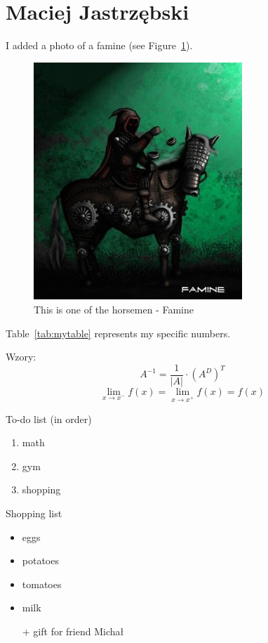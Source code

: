 \section{Maciej Jastrzębski}

I added a photo of a famine (see Figure~\ref{fig:famine}).

\begin{figure}[htbp] %
    \centering
    \includegraphics[width=0.7\textwidth]{pictures/famine.jpg} %
    \caption{This is one of the horsemen - Famine}
    \label{fig:famine}
\end{figure}

Table~\ref{tab:mytable} represents my specific numbers. %




Wzory: 
\[A^{-1} = \frac{1}{|A|} \cdot \left(A^D\right)^T\]
\[\lim_{x\to x^-} f(x) = \lim_{x\to x^+} f(x) = f(x)\]


To-do list (in order)
\begin{enumerate}
    \item math
    \item gym
    \item shopping
\end{enumerate}
\vspace{10pt}

Shopping list
\begin{itemize}
    \item eggs
    \item potatoes
    \item tomatoes
    \item milk
    \item[+] gift for friend Michał
\end{itemize}



